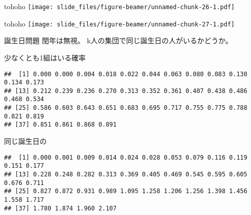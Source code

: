 \documentclass[
  ignorenonframetext,
]{beamer}
\begin{document}
\begin{frame}{tohoho}
\protect\hypertarget{tohoho}{}
\texttt{[image: slide\_files/figure-beamer/unnamed-chunk-26-1.pdf]}
\end{frame}

\begin{frame}[fragile]{tohoho}
\protect\hypertarget{tohoho-1}{}
\texttt{[image: slide\_files/figure-beamer/unnamed-chunk-27-1.pdf]}

\begin{block}{誕生日問題}
\protect\hypertarget{ux8a95ux751fux65e5ux554fux984c}{}
閏年は無視。 k人の集団で同じ誕生日の人がいるかどうか。

\begin{block}{少なくとも1組はいる確率}
\protect\hypertarget{ux5c11ux306aux304fux3068ux30821ux7d44ux306fux3044ux308bux78baux7387}{}
\begin{verbatim}
##  [1] 0.000 0.000 0.004 0.018 0.022 0.044 0.063 0.080 0.083 0.130 0.134 0.173
## [13] 0.212 0.239 0.236 0.270 0.313 0.352 0.361 0.407 0.438 0.486 0.468 0.534
## [25] 0.586 0.603 0.643 0.651 0.683 0.695 0.717 0.755 0.775 0.788 0.821 0.819
## [37] 0.851 0.861 0.868 0.891
\end{verbatim}
\end{block}

\begin{block}{同じ誕生日の}
\protect\hypertarget{ux540cux3058ux8a95ux751fux65e5ux306e}{}
\begin{verbatim}
##  [1] 0.000 0.001 0.009 0.014 0.024 0.028 0.053 0.079 0.116 0.119 0.151 0.177
## [13] 0.228 0.248 0.282 0.313 0.369 0.405 0.469 0.545 0.595 0.605 0.676 0.711
## [25] 0.827 0.872 0.931 0.989 1.095 1.258 1.206 1.256 1.398 1.456 1.558 1.717
## [37] 1.780 1.874 1.960 2.107
\end{verbatim}
\end{block}
\end{block}
\end{frame}
\end{document}
